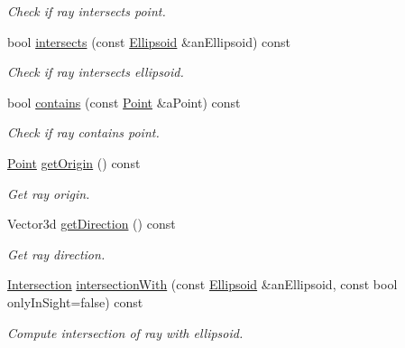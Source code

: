 \begin{DoxyCompactItemize}
\begin{DoxyCompactList}\small\item\em Check if ray intersects point. \end{DoxyCompactList}\item 
bool \hyperlink{classlibrary_1_1math_1_1geom_1_1d3_1_1objects_1_1_ray_a691d9fda5c22f8cef0b412b9173fe71b}{intersects} (const \hyperlink{classlibrary_1_1math_1_1geom_1_1d3_1_1objects_1_1_ellipsoid}{Ellipsoid} \&an\+Ellipsoid) const
\begin{DoxyCompactList}\small\item\em Check if ray intersects ellipsoid. \end{DoxyCompactList}\item 
bool \hyperlink{classlibrary_1_1math_1_1geom_1_1d3_1_1objects_1_1_ray_a6179dc1453ac7a54b13fe6bf46c0a66b}{contains} (const \hyperlink{classlibrary_1_1math_1_1geom_1_1d3_1_1objects_1_1_point}{Point} \&a\+Point) const
\begin{DoxyCompactList}\small\item\em Check if ray contains point. \end{DoxyCompactList}\item 
\hyperlink{classlibrary_1_1math_1_1geom_1_1d3_1_1objects_1_1_point}{Point} \hyperlink{classlibrary_1_1math_1_1geom_1_1d3_1_1objects_1_1_ray_abaac9b7fcc10e2076ada11f2798386bd}{get\+Origin} () const
\begin{DoxyCompactList}\small\item\em Get ray origin. \end{DoxyCompactList}\item 
Vector3d \hyperlink{classlibrary_1_1math_1_1geom_1_1d3_1_1objects_1_1_ray_ab2e0a6cfd7c2c288ec615a479024fb7d}{get\+Direction} () const
\begin{DoxyCompactList}\small\item\em Get ray direction. \end{DoxyCompactList}\item 
\hyperlink{classlibrary_1_1math_1_1geom_1_1d3_1_1_intersection}{Intersection} \hyperlink{classlibrary_1_1math_1_1geom_1_1d3_1_1objects_1_1_ray_aea1460113fed4868d652c5f3bd7a9422}{intersection\+With} (const \hyperlink{classlibrary_1_1math_1_1geom_1_1d3_1_1objects_1_1_ellipsoid}{Ellipsoid} \&an\+Ellipsoid, const bool only\+In\+Sight=false) const
\begin{DoxyCompactList}\small\item\em Compute intersection of ray with ellipsoid. \end{DoxyCompactList}\item 

\end{DoxyCompactItemize}
